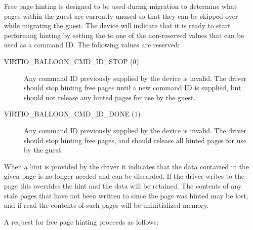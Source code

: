 Free page hinting is designed to be used during migration to determine what
pages within the guest are currently unused so that they can be skipped over
while migrating the guest. The device will indicate that it is ready to start
performing hinting by setting the  to one of the
non-reserved values that can be used as a command ID. The following values
are reserved:

\begin{description}
\item[VIRTIO_BALLOON_CMD_ID_STOP (0)] Any command ID previously supplied by
  the device is invalid. The driver should stop hinting free pages until a
  new command ID is supplied, but should not release any hinted pages for
  use by the guest.

\item[VIRTIO_BALLOON_CMD_ID_DONE (1)] Any command ID previously supplied by
  the device is invalid. The driver should stop hinting free pages, and
  should release all hinted pages for use by the guest.
\end{description}

When a hint is provided by the driver it indicates that the data contained
in the given page is no longer needed and can be discarded. If the driver
writes to the page this overrides the hint and the data will be retained.
The contents of any stale pages that have not been written to since the
page was hinted may be lost, and if read the contents of such pages will
be uninitialized memory.

A request for free page hinting proceeds as follows:

